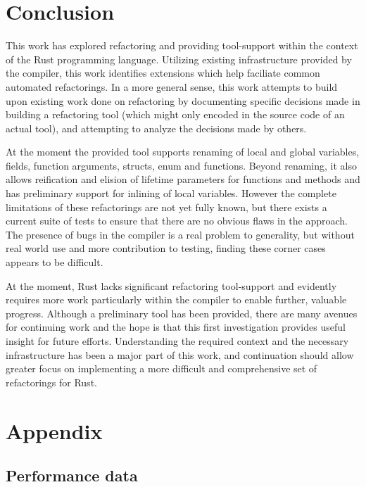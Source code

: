 \chapter{Conclusion}\label{C:con}
This work has explored refactoring and providing tool-support within the context of the Rust programming language. Utilizing existing infrastructure provided by the compiler, this work identifies extensions which help faciliate common automated refactorings. In a more general sense, this work attempts to build upon existing work done on refactoring by documenting specific decisions made in building a refactoring tool (which might only encoded in the source code of an actual tool), and attempting to analyze the decisions made by others.


At the moment the provided tool supports renaming of local and global variables, fields, function arguments, structs, enum and functions. Beyond renaming, it also allows reification and elision of lifetime parameters for functions and methods and has preliminary support for inlining of local variables. However the complete limitations of these refactorings are not yet fully known, but there exists a current suite of tests to ensure that there are no obvious flaws in the approach. The presence of bugs in the compiler is a real problem to generality, but without real world use and more contribution to testing, finding these corner cases appears to be difficult.

At the moment, Rust lacks significant refactoring tool-support and evidently requires more work particularly within the compiler to enable further, valuable progress. Although a preliminary tool has been provided, there are many avenues for continuing work and the hope is that this first investigation provides useful insight for future efforts. Understanding the required context and the necessary infrastructure has been a major part of this work, and continuation should allow greater focus on implementing a more difficult and comprehensive set of refactorings for Rust.

\chapter*{Appendix}\label{C:appen}
\section{Performance data}

